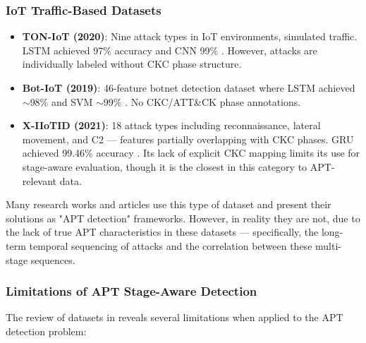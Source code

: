 \subsubsection{IoT Traffic-Based Datasets}

\begin{itemize}
    \item \textbf{TON-IoT (2020)}: Nine attack types in IoT environments, simulated traffic. LSTM achieved 97\% accuracy and CNN 99\% \cite{ankalaki2025cyber}. However, attacks are individually labeled without CKC phase structure.
    \item \textbf{Bot-IoT (2019)}: 46-feature botnet detection dataset where LSTM achieved $\sim$98\% and SVM $\sim$99\% \cite{ankalaki2025cyber}. No CKC/ATT\&CK phase annotations.
    \item \textbf{X-IIoTID (2021)}: 18 attack types including reconnaissance, lateral movement, and C2 --- features partially overlapping with CKC phases. GRU achieved 99.46\% accuracy \cite{ankalaki2025cyber}. Its lack of explicit CKC mapping limits its use for stage-aware evaluation, though it is the closest in this category to APT-relevant data.
\end{itemize}

Many research works and articles use this type of dataset and present their solutions as "APT detection" frameworks. However, in reality they are not, due to the lack of true APT characteristics in these datasets --- specifically, the long-term temporal sequencing of attacks and the correlation between these multi-stage sequences.

\subsubsection{Limitations of APT Stage-Aware Detection}

The review of datasets in \cite{ankalaki2025cyber} reveals several  limitations when applied to the APT detection problem:

